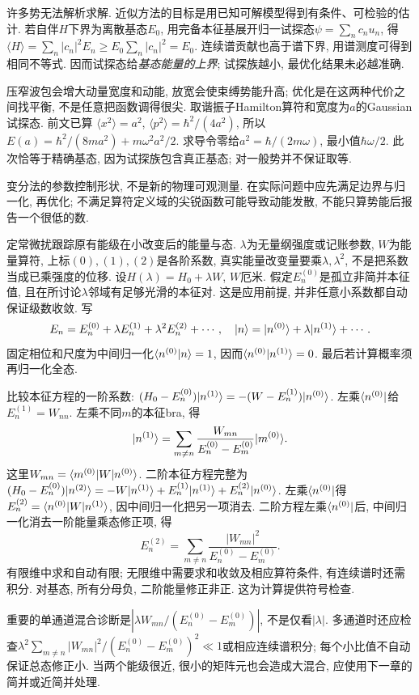 许多势无法解析求解. 近似方法的目标是用已知可解模型得到有条件、可检验的估计. 若自伴$H$下界为离散基态$E_0$, 用完备本征基展开归一试探态$\psi=\sum_nc_nu_n$, 得 $\langle H\rangle=\sum_n|c_n|^2E_n\ge E_0\sum_n|c_n|^2=E_0$. 连续谱贡献也高于谱下界, 用谱测度可得到相同不等式. 因而试探态给\emph{基态能量的上界}; 试探族越小, 最优化结果未必越准确.

压窄波包会增大动量宽度和动能, 放宽会使束缚势能升高; 优化是在这两种代价之间找平衡, 不是任意把函数调得很尖. 取谐振子Hamilton算符和宽度为$a$的Gaussian试探态. 前文已算 $\langle x^2\rangle=a^2$, $\langle p^2\rangle=\hbar^2/(4a^2)$, 所以
$E(a)=\hbar^2/(8ma^2)+m\omega^2a^2/2$. 求导令零给$a^2=\hbar/(2m\omega)$, 最小值$\hbar\omega/2$. 此次恰等于精确基态, 因为试探族包含真正基态; 对一般势并不保证取等.

变分法的参数控制形状, 不是新的物理可观测量. 在实际问题中应先满足边界与归一化, 再优化; 不满足算符定义域的尖锐函数可能导致动能发散, 不能只算势能后报告一个很低的数.

定常微扰跟踪原有能级在小改变后的能量与态. $\lambda$为无量纲强度或记账参数, $W$为能量算符, 上标$(0),(1),(2)$是各阶系数, 真实能量改变量要乘$\lambda,\lambda^2$, 不是把系数当成已乘强度的位移. 设$H(\lambda)=H_0+\lambda W$, $W$厄米. 假定$E_n^{(0)}$是孤立非简并本征值, 且在所讨论$\lambda$邻域有足够光滑的本征对. 这是应用前提, 并非任意小系数都自动保证级数收敛. 写
\[
E_n=E_n^{(0)}+\lambda E_n^{(1)}+\lambda^2E_n^{(2)}+\cdots,
\quad
\lvert n\rangle=\lvert n^{(0)}\rangle+\lambda\lvert n^{(1)}\rangle+\cdots.
\]
固定相位和尺度为中间归一化$\langle n^{(0)}\vert n\rangle=1$, 因而$\langle n^{(0)}\vert n^{(1)}\rangle=0$. 最后若计算概率须再归一化全态.

比较本征方程的一阶系数:
$(H_0-E_n^{(0)})\lvert n^{(1)}\rangle=-(W-E_n^{(1)})\lvert n^{(0)}\rangle$. 左乘$\langle n^{(0)}\rvert$给$E_n^{(1)}=W_{nn}$. 左乘不同$m$的本征bra, 得
\[
\lvert n^{(1)}\rangle=\sum_{m\ne n}
\frac{W_{mn}}{E_n^{(0)}-E_m^{(0)}}\lvert m^{(0)}\rangle.
\]
这里$W_{mn}=\langle m^{(0)}\rvert W\lvert n^{(0)}\rangle$. 二阶本征方程完整为$(H_0-E_n^{(0)})\lvert n^{(2)}\rangle=-W\lvert n^{(1)}\rangle+E_n^{(1)}\lvert n^{(1)}\rangle+E_n^{(2)}\lvert n^{(0)}\rangle$. 左乘$\langle n^{(0)}\rvert$得$E_n^{(2)}=\langle n^{(0)}\rvert W\lvert n^{(1)}\rangle$, 因中间归一化把另一项消去. 二阶方程左乘$\langle n^{(0)}\rvert$后, 中间归一化消去一阶能量乘态修正项, 得
\[
E_n^{(2)}=\sum_{m\ne n}\frac{|W_{mn}|^2}{E_n^{(0)}-E_m^{(0)}}.
\]
有限维中求和自动有限; 无限维中需要求和收敛及相应算符条件, 有连续谱时还需积分. 对基态, 所有分母负, 二阶能量修正非正. 这为计算提供符号检查.

重要的单通道混合诊断是$|\lambda W_{mn}/(E_n^{(0)}-E_m^{(0)})|$, 不是仅看$|\lambda|$. 多通道时还应检查$\lambda^2\sum_{m\ne n}|W_{mn}|^2/(E_n^{(0)}-E_m^{(0)})^2\ll1$或相应连续谱积分; 每个小比值不自动保证总态修正小. 当两个能级很近, 很小的矩阵元也会造成大混合, 应使用下一章的简并或近简并处理.


